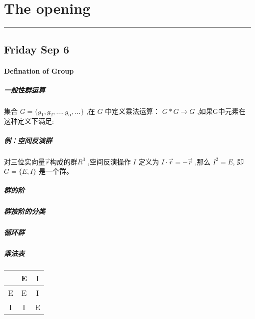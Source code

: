 \section{The opening}
\vspace{-15pt}\noindent\rule{\textwidth}{0.1pt}\vspace{-10pt}
    \subsection{\hfill \small Friday Sep 6}
    
        \paragraph{Defination of Group}
        \subparagraph{一般性群运算}集合 $G = \{g_1,g_2,...,g_\alpha,...\}$ ,在 $G$ 中定义乘法运算： $G*G\rightarrow G$ ,如果G中元素在这种定义下满足:


        \subparagraph*{例：空间反演群}对三位实向量$\vec{r}$构成的群$R^3$ ,空间反演操作 $I$ 定义为 $I\cdot \vec{r}=-\vec{r}$ ,那么 $I^2=E$, 即 $G=\{E,I\}$ 是一个群。

        \subparagraph*{群的阶}
        \subparagraph*{群按阶的分类}
        \subparagraph*{循环群}
        \subparagraph*{乘法表}
        \begin{center}
            \begin{tabular}{c|c c}
                ~ & E & I \\
                \hline
                E & E & I \\
                I & I & E \\
            \end{tabular}
        \end{center}
        
